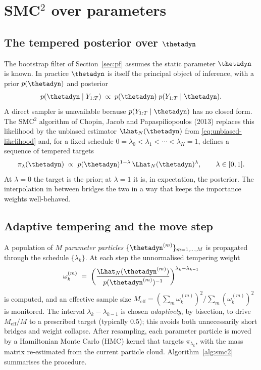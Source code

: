 \section{SMC${}^2$ over parameters}\label{sec:smc2}

\subsection{The tempered posterior over $\thetadyn$}

The bootstrap filter of Section~\ref{sec:pf} assumes the static parameter
$\thetadyn$ is known. In practice $\thetadyn$ is itself the principal object
of inference, with a prior $p(\thetadyn)$ and posterior
\begin{equation}
  p(\thetadyn \mid Y_{1:T})
    \;\propto\; p(\thetadyn)\;p(Y_{1:T}\mid\thetadyn).
\end{equation}
A direct sampler is unavailable because $p(Y_{1:T}\mid\thetadyn)$ has no
closed form. The SMC${}^2$ algorithm of Chopin, Jacob and Papaspiliopoulos
(2013) replaces this likelihood by the unbiased estimator
$\Lhat_N(\thetadyn)$ from \eqref{eq:unbiased-likelihood} and, for a fixed
schedule $0 = \lambda_0 < \lambda_1 < \cdots < \lambda_K = 1$, defines a
sequence of tempered targets
\begin{equation}
  \pi_\lambda(\thetadyn) \;\propto\;
    p(\thetadyn)^{1-\lambda}\,\Lhat_N(\thetadyn)^{\lambda},
    \qquad \lambda \in [0,1].
  \label{eq:tempered-target}
\end{equation}
At $\lambda=0$ the target is the prior; at $\lambda=1$ it is, in
expectation, the posterior. The interpolation in between bridges the two
in a way that keeps the importance weights well-behaved.

\subsection{Adaptive tempering and the move step}

A population of $M$ \emph{parameter particles}
$\{\thetadyn^{(m)}\}_{m=1,\dots,M}$ is propagated through the schedule
$\{\lambda_k\}$. At each step the unnormalised tempering weight
\begin{equation}
  \omega_k^{(m)} \;=\;
    \biggl(\frac{\Lhat_N(\thetadyn^{(m)})}{p(\thetadyn^{(m)})^{-1}}\biggr)
    ^{\lambda_k - \lambda_{k-1}}
\end{equation}
is computed, and an effective sample size
$M_{\mathrm{eff}} = (\sum_m \omega_k^{(m)})^2 / \sum_m (\omega_k^{(m)})^2$
is monitored. The interval $\lambda_k - \lambda_{k-1}$ is chosen
\emph{adaptively}, by bisection, to drive $M_{\mathrm{eff}}/M$ to a
prescribed target (typically $0.5$); this avoids both unnecessarily
short bridges and weight collapse. After resampling, each parameter
particle is moved by a Hamiltonian Monte Carlo (HMC) kernel that targets
$\pi_{\lambda_k}$, with the mass matrix re-estimated from the current
particle cloud. Algorithm~\ref{alg:smc2} summarises the procedure.

